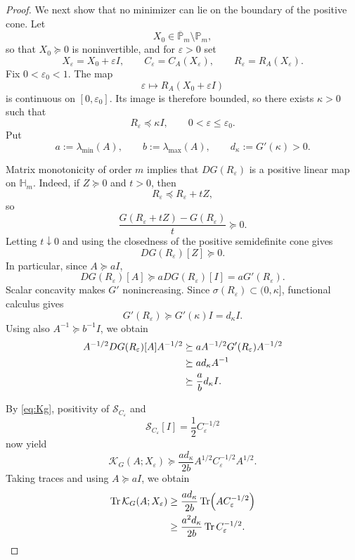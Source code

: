 \documentclass[10pt,a4paper]{amsart}
\newcommand{\Pm}{\mathbb P_m}
\newcommand{\Tr}{\operatorname{Tr}}
\begin{document}
\begin{proof}
		We next show that no minimizer can lie on the boundary of the positive
		cone.  Let
		\[
		X_0\in\overline{\mathbb{P}}_m\setminus\Pm,
		\]
		so that $X_0\succeq0$ is noninvertible, and for $\varepsilon>0$ set
		\[
		X_\varepsilon=X_0+\varepsilon I,
		\qquad
		C_\varepsilon=C_A(X_\varepsilon),
		\qquad
		R_\varepsilon=R_A(X_\varepsilon).
		\]
		Fix $0<\varepsilon_0<1$.  The map
		\[
		\varepsilon\longmapsto R_A(X_0+\varepsilon I)
		\]
		is continuous on $[0,\varepsilon_0]$.  Its image is therefore
		bounded, so there exists $\kappa>0$ such that
		\[
		R_\varepsilon\preceq\kappa I,
		\qquad 0<\varepsilon\le\varepsilon_0.
		\]
		Put
		\[
		a:=\lambda_{\min}(A),
		\qquad
		b:=\lambda_{\max}(A),
		\qquad
		d_\kappa:=G'(\kappa)>0.
		\]
		
		Matrix monotonicity of order $m$ implies that
		$DG(R_\varepsilon)$ is a positive linear map on $\mathbb H_m$.
		Indeed, if $Z\succeq0$ and $t>0$, then
		\[
		R_\varepsilon\preceq R_\varepsilon+tZ,
		\]
		so
		\[
		\frac{G(R_\varepsilon+tZ)-G(R_\varepsilon)}{t}\succeq0.
		\]
		Letting $t\downarrow0$ and using the closedness of the positive
		semidefinite cone gives
		\[
		DG(R_\varepsilon)[Z]\succeq0.
		\]
		In particular, since $A\succeq aI$,
		\[
		DG(R_\varepsilon)[A]
		\succeq aDG(R_\varepsilon)[I]
		=aG'(R_\varepsilon).
		\]
		Scalar concavity makes $G'$ nonincreasing.  Since
		$\sigma(R_\varepsilon)\subset(0,\kappa]$, functional calculus gives
		\[
		G'(R_\varepsilon)\succeq G'(\kappa)I=d_\kappa I.
		\]
		Using also $A^{-1}\succeq b^{-1}I$, we obtain
		\begin{align}
			A^{-1/2}DG(R_\varepsilon)[A]A^{-1/2}
			&\succeq
			aA^{-1/2}G'(R_\varepsilon)A^{-1/2} \notag\\
			&\succeq
			ad_\kappa A^{-1} \notag\\
			&\succeq
			\frac{a}{b}d_\kappa I.
			\label{eq:DG-lower-bound}
		\end{align}
		
		By \eqref{eq:Kg}, positivity of
		$\mathcal S_{C_\varepsilon}$ and
		\[
		\mathcal S_{C_\varepsilon}[I]
		=\frac12C_\varepsilon^{-1/2}
		\]
		now yield
		\[
		\mathcal K_G(A;X_\varepsilon)
		\succeq
		\frac{ad_\kappa}{2b}
		A^{1/2}C_\varepsilon^{-1/2}A^{1/2}.
		\]
		Taking traces and using $A\succeq aI$, we obtain
		\begin{align}
			\Tr\mathcal K_G(A;X_\varepsilon)
			&\ge
			\frac{ad_\kappa}{2b}
			\Tr\!\left(AC_\varepsilon^{-1/2}\right) \notag\\
			&\ge
			\frac{a^2d_\kappa}{2b}
			\Tr C_\varepsilon^{-1/2}.
			\label{eq:KG-boundary-blowup}
		\end{align}
		

\end{proof}
\end{document}
